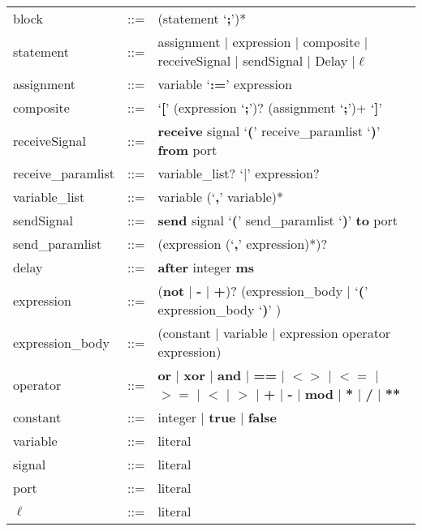 \documentclass[parskip]{scrartcl}
\theoremstyle{definition}
\begin{document}
\begingroup
\renewcommand{\familydefault}{\sfdefault}
\renewcommand*\rmdefault{sourceserifpro}
\begin{center}
\small
\begin{tabular}{lll}
block & ::= & (statement `\textbf{;}')* \\
statement & ::= & assignment $\mid$ expression $\mid$ composite $\mid$ receiveSignal $\mid$ sendSignal $\mid$ Delay $\mid \ell$ \\
assignment & ::= & variable `\textbf{:=}' expression\\
composite & ::= & `\textbf{[}' (expression `\textbf{;}')? (assignment `\textbf{;}')+ `\textbf{]}'\\
receiveSignal & ::= & \textbf{receive} signal `\textbf{(}' receive\_paramlist `\textbf{)}' \textbf{from} port \\
receive\_paramlist & ::= & variable\_list? `\textbf{$\mid$}' expression? \\
variable\_list & ::= & variable (`\textbf{,}' variable)* \\
sendSignal & ::= & \textbf{send} signal `\textbf{(}' send\_paramlist `\textbf{)}' \textbf{to} port \\
send\_paramlist & ::= & (expression (`\textbf{,}' expression)*)? \\
delay & ::= & \textbf{after} integer \textbf{ms}\\
expression & ::= & (\textbf{not} $\mid$ \textbf{-} $\mid$ \textbf{+})? (expression\_body $\mid$ `\textbf{(}' expression\_body `\textbf{)}' )\\
expression\_body & ::= & (constant $\mid$ variable $\mid$ expression operator expression)\\
operator & ::= & \textbf{or} $\mid$ \textbf{xor} $\mid$ \textbf{and} $\mid$ \textbf{==} $\mid$ $\bm{<>}$ $\mid$ $\bm{<=}$ $\mid$ $\bm{>=}$ $\mid$ $\bm{<}$ $\mid$ $\bm{>}$ $\mid$ \textbf{+} $\mid$ \textbf{-} $\mid$ \textbf{mod} $\mid$ \textbf{*} $\mid$ \textbf{/} $\mid$ \textbf{**}\\
constant & ::= & integer $\mid$ \textbf{true} $\mid$ \textbf{false}\\
variable & ::= & literal\\
signal & ::= & literal\\
port & ::= & literal\\
$\ell$ & ::= & literal\\
\end{tabular}
\end{center}
\endgroup
\end{document}
